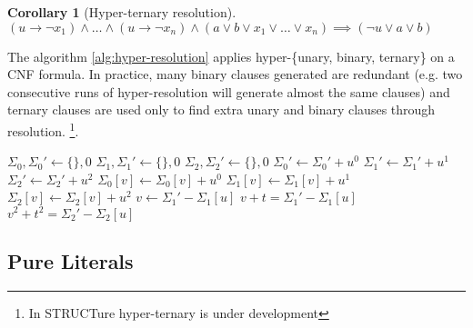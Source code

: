 \documentclass[12pt]{article}
\newtheorem{corollary}{Corollary}
\begin{document}
\begin{corollary}[Hyper-ternary resolution]
$(u \rightarrow \neg x_1) \land \ldots \land (u \rightarrow \neg x_n) \land (a \lor b \lor x_1 \lor \dots \lor x_n) \implies (\neg u \lor a \lor b)$
\end{corollary}

The algorithm \ref{alg:hyper-resolution} applies hyper-\{unary, binary, ternary\} on a CNF
formula. In practice, many binary clauses generated are redundant (e.g. two consecutive runs
of hyper-resolution will generate almost the same clauses) and ternary clauses are used only
to find extra unary and binary clauses through resolution. \footnote{In STRUCTure hyper-ternary
is under development}.

\begin{algorithm}[h!]
\begin{algorithmic}
\STATE $\Sigma_0, \Sigma_0' \gets \{\}, 0$
\STATE $\Sigma_1, \Sigma_1' \gets \{\}, 0$
\STATE $\Sigma_2, \Sigma_2' \gets \{\}, 0$
    \STATE $\Sigma_0' \gets \Sigma_0' + u^0$
    \STATE $\Sigma_1' \gets \Sigma_1' + u^1$
    \STATE $\Sigma_2' \gets \Sigma_2' + u^2$
      \STATE $\Sigma_0[v] \gets \Sigma_0[v] + u^0$
      \STATE $\Sigma_1[v] \gets \Sigma_1[v] + u^1$
      \STATE $\Sigma_2[v] \gets \Sigma_2[v] + u^2$
    \ENDFOR
  \ENDFOR
      \STATE $v \gets \Sigma_1' - \Sigma_1[u]$
      \STATE {}
      \STATE $v + t = \Sigma_1' - \Sigma_1[u]$
      \STATE $v^2 + t^2 = \Sigma_2' - \Sigma_2[u]$
    \ENDIF
  \ENDFOR
\ENDFOR
\end{algorithmic}

\caption{Hyper resolution}
\label{alg:hyper-resolution}
\end{algorithm}


\subsection{Pure Literals}
\end{document}
